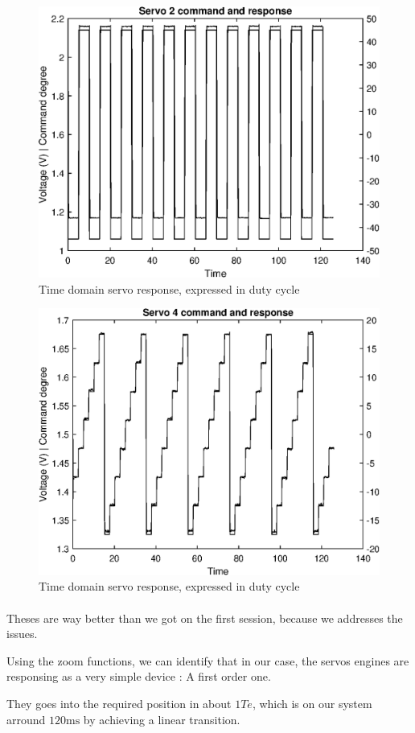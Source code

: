 \begin{figure}[!hbt]
    \centering
    \includegraphics[width=\SchematicWidth]{images/Servos/reduced-square.eps}
    \caption{Time domain servo response, expressed in duty cycle}
\end{figure}
\begin{figure}[!hbt]
    \centering
    \includegraphics[width=\SchematicWidth]{images/Servos/ramp.eps}
    \caption{Time domain servo response, expressed in duty cycle}
\end{figure}
\FloatBarrier

\paragraph{}
Theses are way better than we got on the first session, because we addresses the issues.

Using the zoom functions, we can identify that in our case, the servos engines are responsing
as a very simple device : A first order one.

They goes into the required position in about $1 Te$, which is on our system arround 
$120 \si{\milli\second}$ by achieving a linear transition.


